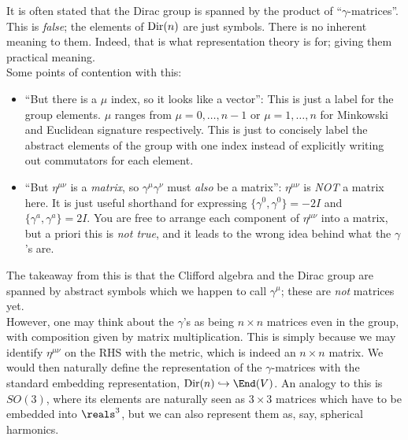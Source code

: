 \documentclass[11pt]{article}
\begin{document}
\begin{reemark}
    It is often stated that the Dirac group is spanned by the product of
    ``$\gamma$-matrices''. This is \emph{false}; the elements of ${\rm Dir}(n)$
    are just symbols. There is no inherent meaning to them. Indeed, that 
    is what representation theory is for; giving them practical meaning.\\

    \noin
    Some points of contention with this:
    \begin{itemize}
        \item ``But there is a $\mu$ index, so it looks like a vector'':
        This is just a label for the group elements. $\mu$ ranges from
        $\mu = 0, \ldots, n - 1$ or $\mu = 1, \ldots, n$ for Minkowski and
        Euclidean signature respectively. This is just to concisely label the
        abstract elements of the group with one index instead of explicitly
        writing out commutators for each element.
        \item ``But $\eta^{\mu \nu}$ is a \emph{matrix}, so $\gamma^\mu \gamma^\nu$
        must \emph{also} be a matrix'': $\eta^{\mu \nu}$ is \emph{NOT} a matrix
        here. It is just useful shorthand for expressing $\{ \gamma^0, \gamma^0 \} = - 2I$
        and $\{ \gamma^a, \gamma^a \} = 2 I$. You are free to arrange each component
        of $\eta^{\mu \nu}$ into a matrix, but a priori this is \emph{not true}, and it leads
        to the wrong idea behind what the $\gamma$'s are.
    \end{itemize}
    The takeaway from this is that the Clifford algebra and the Dirac group are
    spanned by abstract symbols which we happen to call $\gamma^\mu$; these are
    \emph{not} matrices yet.\\

    \noin
    However, one may think about the $\gamma$'s as being $n \times n$
    matrices even in the group, with composition given by matrix multiplication.
    This is simply because we may identify $\eta^{\mu \nu}$ on the RHS
    with the metric, which is indeed an $n \times n$ matrix. We would
    then naturally define the representation of the $\gamma$-matrices
    with the standard embedding representation, $\operatorname{Dir}(n) \hookrightarrow \End(V)$.
    An analogy to this is $SO(3)$, where its elements are naturally
    seen as $3 \times 3$ matrices which have to be embedded into $\reals^3$,
    but we can also represent them as, say, spherical harmonics.
\end{reemark}
\end{document}
